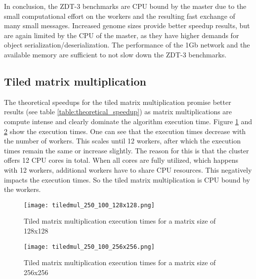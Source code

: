 In conclusion, the ZDT-3 benchmarks are CPU bound by the master due to the small computational effort on the workers and the resulting fast exchange of many small messages. Increased genome sizes provide better speedup results, but are again limited by the CPU of the master, as they have higher demands for object serialization/deserialization. The performance of the 1Gb network and the available memory are sufficient to not slow down the ZDT-3 benchmarks.

\subsection{Tiled matrix multiplication}
The theoretical speedups for the tiled matrix multiplication promise better results (see table \ref{table:theoretical_speedup}) as matrix multiplications are compute intense and clearly dominate the algorithm execution time. Figure \ref{fig:tiledmul_250_100_128x128} and \ref{fig:tiledmul_250_100_256x256} show the execution times. One can see that the execution times decrease with the number of workers. This scales until 12 workers, after which the execution times remain the same or increase slightly. The reason for this is that the cluster offers 12 CPU cores in total. When all cores are fully utilized, which happens with 12 workers, additional workers have to share CPU resources. This negatively impacts the execution times. So the tiled matrix multiplication is CPU bound by the workers.

\begin{figure}[ht!]
  \centering
  \texttt{[image: tiledmul\_250\_100\_128x128.png]}
  \caption{Tiled matrix multiplication execution times for a matrix size of 128x128}
  \label{fig:tiledmul_250_100_128x128}
\end{figure}
\begin{figure}[ht!]
  \centering
  \texttt{[image: tiledmul\_250\_100\_256x256.png]}
  \caption{Tiled matrix multiplication execution times for a matrix size of 256x256}
  \label{fig:tiledmul_250_100_256x256}
\end{figure}


